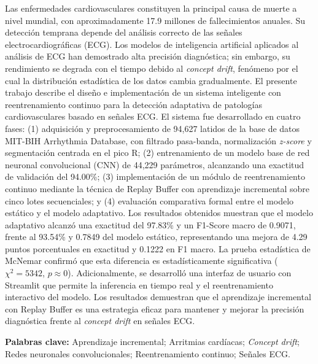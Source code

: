 
 


Las enfermedades cardiovasculares constituyen la principal causa de muerte a nivel mundial, con aproximadamente 17.9 millones de fallecimientos anuales. Su detección temprana depende del análisis correcto de las señales electrocardiográficas (ECG). Los modelos de inteligencia artificial aplicados al análisis de ECG han demostrado alta precisión diagnóstica; sin embargo, su rendimiento se degrada con el tiempo debido al \textit{concept drift}, fenómeno por el cual la distribución estadística de los datos cambia gradualmente. El presente trabajo describe el diseño e implementación de un sistema inteligente con reentrenamiento continuo para la detección adaptativa de patologías cardiovasculares basado en señales ECG. El sistema fue desarrollado en cuatro fases: (1) adquisición y preprocesamiento de 94,627 latidos de la base de datos MIT-BIH Arrhythmia Database, con filtrado pasa-banda, normalización \textit{z-score} y segmentación centrada en el pico R; (2) entrenamiento de un modelo base de red neuronal convolucional (CNN) de 44,229 parámetros, alcanzando una exactitud de validación del 94.00\%; (3) implementación de un módulo de reentrenamiento continuo mediante la técnica de Replay Buffer con aprendizaje incremental sobre cinco lotes secuenciales; y (4) evaluación comparativa formal entre el modelo estático y el modelo adaptativo. Los resultados obtenidos muestran que el modelo adaptativo alcanzó una exactitud del 97.83\% y un F1-Score macro de 0.9071, frente al 93.54\% y 0.7849 del modelo estático, representando una mejora de 4.29 puntos porcentuales en exactitud y 0.1222 en F1 macro. La prueba estadística de McNemar confirmó que esta diferencia es estadísticamente significativa ($\chi^2 = 5342$, $p \approx 0$). Adicionalmente, se desarrolló una interfaz de usuario con Streamlit que permite la inferencia en tiempo real y el reentrenamiento interactivo del modelo. Los resultados demuestran que el aprendizaje incremental con Replay Buffer es una estrategia eficaz para mantener y mejorar la precisión diagnóstica frente al \textit{concept drift} en señales ECG.

\bigskip

\noindent \textbf{Palabras clave:} Aprendizaje incremental; Arritmias cardíacas; \textit{Concept drift}; Redes neuronales convolucionales; Reentrenamiento continuo; Señales ECG.
